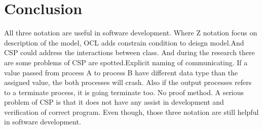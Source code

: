 \section{Conclusion}
All three notation are useful in software development. Where Z notation focus on description of the model, OCL adds constrain condition to deisgn model.And CSP could address the interactions between class. And during the research there are some problems of CSP are spotted.Explicit naming of communicating. If a value passed from process A to process B have different data type than the assigned value, the both processes will crash. Also if the output processes refers to a terminate process, it is going terminate too. No proof method. A serious problem of CSP is that it does not have any assist in development and verification of correct program. Even though, those three notation are still helpful in software development. 

